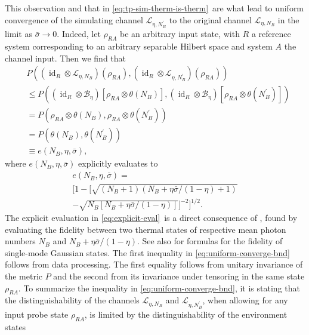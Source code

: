\documentclass[apsrev,twocolumn]{revtex4-1}%
\begin{document}
\noindent This observation and that in \eqref{eq:tp-sim-therm-is-therm}\ are
what lead to uniform convergence of the simulating channel $\mathcal{L}%
_{\eta,N_{B}^{\prime}}$ to the original channel $\mathcal{L}_{\eta,N_{B}}$ in
the limit as $\bar{\sigma}\rightarrow0$. Indeed, let $\rho_{RA}$ be an
arbitrary input state, with $R$ a reference system corresponding to an
arbitrary separable Hilbert space and system $A$ the channel input. Then we
find that%
\begin{align}
&  P((\operatorname{id}_{R}\otimes\mathcal{L}_{\eta,N_{B}})(\rho
_{RA}),(\operatorname{id}_{R}\otimes\mathcal{L}_{\eta,N_{B}^{\prime}}%
)(\rho_{RA}))\nonumber\\
&  \leq P((\operatorname{id}_{R}\otimes\mathcal{B}_{\eta})[\rho_{RA}%
\otimes\theta(N_{B})],(\operatorname{id}_{R}\otimes\mathcal{B}_{\eta}%
)[\rho_{RA}\otimes\theta(N_{B}^{\prime})])\nonumber\\
&  =P(\rho_{RA}\otimes\theta(N_{B}),\rho_{RA}\otimes\theta(N_{B}^{\prime
}))\nonumber\\
&  =P(\theta(N_{B}),\theta(N_{B}^{\prime}))\nonumber\\
&  \equiv e(N_{B},\eta,\bar{\sigma}), \label{eq:uniform-converge-bnd}%
\end{align}
where $e(N_{B},\eta,\bar{\sigma})$ explicitly evaluates to%
\begin{multline}
e(N_{B},\eta,\bar{\sigma})=\label{eq:explicit-eval}\\
\Bigg[1-\Big[\sqrt{\left(  N_{B}+1\right)  \left(  N_{B}+\eta\bar{\sigma
}/(1-\eta)+1\right)  }\\
-\sqrt{N_{B}\left[  N_{B}+\eta\bar{\sigma}/(1-\eta)\right]  }\Big]^{-2}%
\Bigg]^{1/2}.
\end{multline}
The explicit evaluation in \eqref{eq:explicit-eval}\ is a direct consequence
of \cite[Eqs.~(34)--(35)]{TW16}, found by evaluating the fidelity between two
thermal states of respective mean photon numbers $N_{B}$ and $N_{B}+\eta
\bar{\sigma}/(1-\eta)$. See also \cite{H75,S98} for formulas for the fidelity of single-mode Gaussian states. The first inequality in
\eqref{eq:uniform-converge-bnd} follows from data processing. The first
equality follows from unitary invariance of the metric $P$ and the second from
its invariance under tensoring in the same state $\rho_{RA}$. To summarize the
inequality in \eqref{eq:uniform-converge-bnd}, it is stating that the
distinguishability of the channels $\mathcal{L}_{\eta,N_{B}}$ and
$\mathcal{L}_{\eta,N_{B}^{\prime}}$, when allowing for any input probe state
$\rho_{RA}$, is limited by the distinguishability of the environment states
\end{document}
